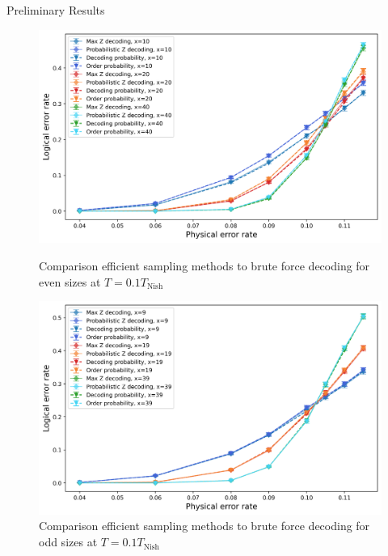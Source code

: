 \documentclass{dfki}
\begin{document}
\begin{frame}{Preliminary Results}
	\begin{figure}[h!]
		\centering
		\begin{minipage}{0.45\textwidth}
			\centering
			\includegraphics[width=\textwidth]{fig/MaxZ_ProbabilisticZ_OrderProb_DecodingProb_even_T01.png}
			\caption{Comparison efficient sampling methods to brute force decoding for even sizes at $T=0.1T_{\text{Nish}}$}
		\end{minipage} \hfill
		\begin{minipage}{0.45\textwidth}
			\centering
			\includegraphics[width=\textwidth]{fig/MaxZ_ProbabilisticZ_OrderProb_DecodingProb_odd_T01.png}
			\caption{Comparison efficient sampling methods to brute force decoding for odd sizes at $T=0.1T_{\text{Nish}}$}
		\end{minipage}
	\end{figure}
\end{frame}
\end{document}
